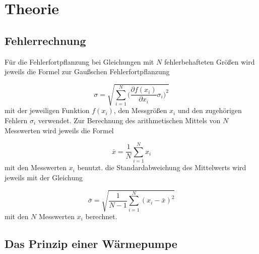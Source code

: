 \section{Theorie}
\label{sec:Theorie}

\subsection{Fehlerrechnung}

Für die Fehlerfortpflanzung bei Gleichungen mit $N$ fehlerbehafteten Größen
wird jeweils die Formel zur Gaußschen Fehlerfortpflanzung

\begin{equation}
  \sigma = \sqrt{\sum_{i=1}^{N}\biggl(\frac{\partial f(x_i)}{\partial x_i}
  \sigma_i\biggr)^2}
\end{equation}
mit der jeweiligen Funktion $f(x_i)$, den Messgrößen $x_i$ und den
zugehörigen Fehlern $\sigma_i$ verwendet.
Zur Berechnung des arithmetischen Mittels von $N$ Messwerten wird jeweils die
Formel

\begin{equation}
  \bar{x} = \frac{1}{N}\sum_{i=1}^{N}x_i
\end{equation}
mit den Messwerten $x_i$ benutzt.
die Standardabweichung des Mittelwerts wird jeweils mit der Gleichung

\begin{equation}
  \bar{\sigma} = \sqrt{\frac{1}{N-1}\sum_{i=1}^{N}(x_i - \bar{x})^2}
\end{equation}
mit den $N$ Messwerten $x_i$ berechnet.


\subsection{Das Prinzip einer Wärmepumpe}

